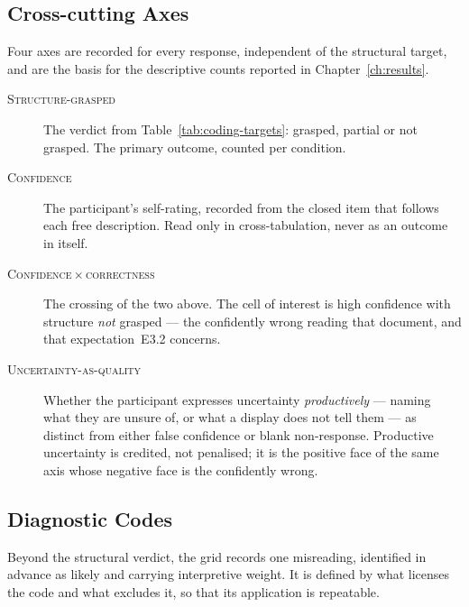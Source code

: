 \subsection{Cross-cutting Axes}
\label{subsec:app-axes}

Four axes are recorded for every response, independent of the structural target, and are the basis for the descriptive counts reported in Chapter~\ref{ch:results}.

\begin{description}
\item[\textnormal{\textsc{Structure-grasped}}] The verdict from Table~\ref{tab:coding-targets}: grasped, partial or not grasped. The primary outcome, counted per condition.

\item[\textnormal{\textsc{Confidence}}] The participant's self-rating, recorded from the closed item that follows each free description. Read only in cross-tabulation, never as an outcome in itself.

\item[\textnormal{\textsc{Confidence\,$\times$\,correctness}}] The crossing of the two above. The cell of interest is high confidence with structure \emph{not} grasped --- the confidently wrong reading that \textcite{fischer2020} document, and that expectation~E3.2 concerns.

\item[\textnormal{\textsc{Uncertainty-as-quality}}] Whether the participant expresses uncertainty \emph{productively} --- naming what they are unsure of, or what a display does not tell them --- as distinct from either false confidence or blank non-response. Productive uncertainty is credited, not penalised; it is the positive face of the same axis whose negative face is the confidently wrong.
\end{description}

\subsection{Diagnostic Codes}
\label{subsec:app-diagnostic}

Beyond the structural verdict, the grid records one misreading, identified in advance as likely and carrying interpretive weight. It is defined by what licenses the code and what excludes it, so that its application is repeatable.

